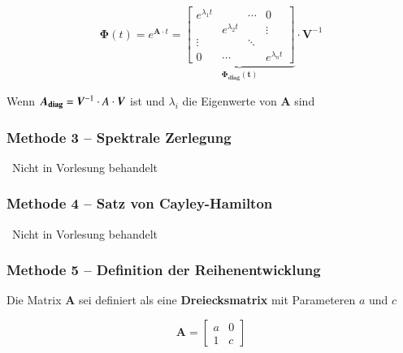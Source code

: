 \begin{minipage}[c]{0.6\columnwidth}
    $$ \bm{\Phi}(t) = e^{\bm{A} \cdot t} = \underbrace{ 
    \begin{bmatrix*} 
        e^{\lambda_1 t} &                   & \cdots        & 0      \\
                        & e^{\lambda_2 t}   &               & \vdots \\
        \vdots          &                   & \ddots        &        \\
        0               & \cdots            &               & e^{\lambda_n t}
\end{bmatrix*}}_{\bm{\Phi_{diag}(t)}} \cdot \bm{V}^{-1} $$
\end{minipage}
\hfill
\begin{minipage}[c]{0.36\columnwidth}
    Wenn $\bm{A_{\rm diag}} = \bm{V}^{-1} \cdot A \cdot \bm{V}$ ist und $\lambda_i$ die Eigenwerte von $\bm{A}$ sind
\end{minipage}


\subsubsection{Methode 3 -- Spektrale Zerlegung}

\textrightarrow\ Nicht in Vorlesung behandelt


\subsubsection{Methode 4 -- Satz von Cayley-Hamilton}
\textrightarrow\ Nicht in Vorlesung behandelt


\subsubsection{Methode 5 -- Definition der Reihenentwicklung}


\begin{minipage}[c]{0.6\columnwidth}
    Die Matrix $\bm{A}$ sei definiert als eine \textbf{Dreiecksmatrix} mit Parameteren $a$ und $c$
\end{minipage}
\hfill
\begin{minipage}[c]{0.38\columnwidth}
    $$ \bm{A} = \begin{bmatrix*} a & 0 \\ 1 & c \end{bmatrix*} $$
\end{minipage}



